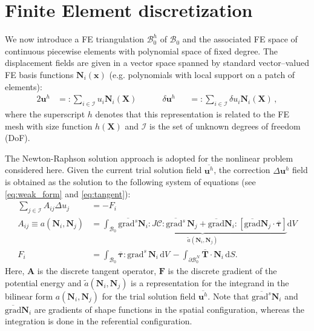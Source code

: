 \documentclass[AMA,STIX1COL]{WileyNJD-v2}
\newcommand*{\gz}[1]{\boldsymbol{#1}}
\newcommand*{\grad}{\mathrm{grad}}
\renewcommand*{\d}{\mathrm{d}}
\newcommand*{\mcl}[1]{\mathcal{#1}}
\begin{document}
\section{Finite Element discretization}
\label{sec:fe}

We now introduce a FE triangulation $\mathcal{B}^h_0$ of $\mcl B_0$ and
the associated FE space of continuous piecewise elements with polynomial space of fixed degree. %
The displacement fields are given in
a vector space spanned by standard vector--valued FE basis functions $\gz N_i(\gz x)$ (e.g. polynomials with local support on a patch of elements):
\begin{alignat}{2}
       \gz u^h &=:  \sum_{i \in \mcl I} u_i \gz N_i (\gz X) \quad \quad \quad
\delta \gz u^h &&=: \sum_{i \in \mcl I} \delta u_i \gz N_i (\gz X) \,,
\end{alignat}
where the superscript $h$ denotes that this representation is related to the FE mesh with size function $h(\gz X)$ and $\mcl I$ is the set of unknown degrees of freedom (DoF).

The Newton-Raphson solution approach is adopted for the nonlinear problem considered here.
Given the current trial solution field $\overline{\gz u^h}$, the correction $\Delta \gz u^h$ field is obtained as the solution to the following system of equations (see \eqref{eq:weak_form} and \eqref{eq:tangent}):
\begin{align}
  \sum_{j \in \mcl I} A_{ij} \Delta u_j &= - F_i  \label{eq:linear_system} \\
  A_{ij} \equiv a(\gz N_i, \gz N_j) &=
  \int_{\mcl B_0}
  \underbrace{
  \overline{\grad^s} \gz N_i : J \boldsymbol{\mathcal{C}} : \overline{\grad^s} \, \gz N_j
  +
  \overline{\grad}\gz N_i :
  \left[
  \overline{\grad} \gz N_j \cdot
  \overline{\gz \tau}
  \right]
  }_{\displaystyle \tilde{a}(\gz N_i, \gz N_j)}
  \d V
  \label{eq:algebraic_tangent}
  \\
  F_i &=
  \int_{\mcl B_0} \overline{\gz \tau} : \grad^{s} \, \gz N_i \, \d V \,
  -
  \int_{\partial \mcl B_0^N} \overline{\gz T} \cdot \gz N_i \, \d S.
\end{align}
Here, $\gz A$ is the discrete tangent operator, $\gz F$ is the discrete gradient of the potential energy
and $\tilde{a}(\gz N_i, \gz N_j)$ is a representation for the integrand in the bilinear form $a(\gz N_i, \gz N_j)$ for the trial solution field $\overline{\gz u^h}$.
Note that $\overline{\grad^s} \gz N_i$ and $\overline{\grad} \gz N_i$ are gradients of shape functions in the spatial configuration, whereas the integration is done in the referential configuration.
\end{document}
